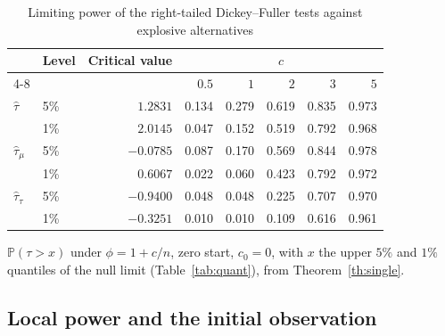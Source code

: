 \documentclass[ecta,nameyear,final]{econsocart}
\newcommand{\PP}{{\mathbb P}}
\theoremstyle{plain}
\theoremstyle{definition}
\begin{document}
\begin{table}[tbp]
\caption{Limiting power of the right-tailed Dickey--Fuller tests against explosive alternatives}
\label{tab:bubble}
\begin{center}
\small
\setlength{\tabcolsep}{5pt}
\begin{tabular}{llrrrrrr}
\toprule
 & Level & Critical value & \multicolumn{5}{c}{$c$}\\
\cmidrule(lr){4-8}
 & & & $0.5$ & $1$ & $2$ & $3$ & $5$\\
\midrule
$\hat\tau$ & 5\% & $1.2831$ & 0.134 & 0.279 & 0.619 & 0.835 & 0.973\\
 & 1\% & $2.0145$ & 0.047 & 0.152 & 0.519 & 0.792 & 0.968\\[0.4ex]
$\hat\tau_\mu$ & 5\% & $-0.0785$ & 0.087 & 0.170 & 0.569 & 0.844 & 0.978\\
 & 1\% & $0.6067$ & 0.022 & 0.060 & 0.423 & 0.792 & 0.972\\[0.4ex]
$\hat\tau_\tau$ & 5\% & $-0.9400$ & 0.048 & 0.048 & 0.225 & 0.707 & 0.970\\
 & 1\% & $-0.3251$ & 0.010 & 0.010 & 0.109 & 0.616 & 0.961\\
\bottomrule
\end{tabular}
\end{center}
{\small $\PP(\tau>x)$ under $\phi=1+c/n$, zero start, $c_0=0$, with $x$ the upper $5\%$ and $1\%$ quantiles of the null limit (Table~\ref{tab:quant}), from Theorem~\ref{th:single}.}
\end{table}

\subsection{Local power and the initial observation}
\label{sec:power}
\end{document}
